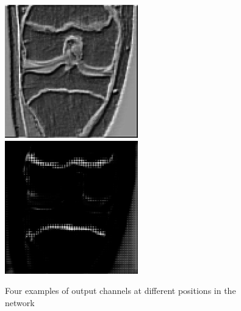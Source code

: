 \begin{figure}[H]
\endminipage\hfill
{}%
  \includegraphics[width=\linewidth]{imgs/channel2.png}
\endminipage\hfill
{}%
  \includegraphics[width=\linewidth]{imgs/channel4.png}
\endminipage
\caption{Four examples of output channels at different positions in the network}
\end{figure}

